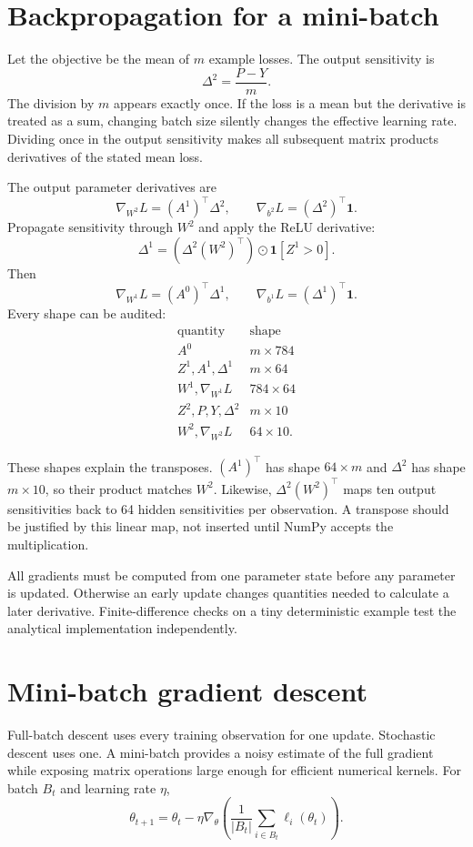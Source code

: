 \section{Backpropagation for a mini-batch}

Let the objective be the mean of $m$ example losses. The output sensitivity is
\[
  \Delta^2=\frac{P-Y}{m}.
\]
The division by $m$ appears exactly once. If the loss is a mean but the
derivative is treated as a sum, changing batch size silently changes the
effective learning rate. Dividing once in the output sensitivity makes all
subsequent matrix products derivatives of the stated mean loss.

The output parameter derivatives are
\[
  \nabla_{W^2}L=(A^1)^\top\Delta^2,
  \qquad
  \nabla_{b^2}L=(\Delta^2)^\top\mathbf1.
\]
Propagate sensitivity through $W^2$ and apply the ReLU derivative:
\[
  \Delta^1
  =\left(\Delta^2(W^2)^\top\right)
   \odot \mathbf1[Z^1>0].
\]
Then
\[
  \nabla_{W^1}L=(A^0)^\top\Delta^1,
  \qquad
  \nabla_{b^1}L=(\Delta^1)^\top\mathbf1.
\]
Every shape can be audited:
\[
\begin{array}{c|c}
\text{quantity}&\text{shape}\\ \hline
A^0&m\times784\\
Z^1,A^1,\Delta^1&m\times64\\
W^1,\nabla_{W^1}L&784\times64\\
Z^2,P,Y,\Delta^2&m\times10\\
W^2,\nabla_{W^2}L&64\times10.
\end{array}
\]

These shapes explain the transposes. $(A^1)^\top$ has shape $64\times m$ and
$\Delta^2$ has shape $m\times10$, so their product matches $W^2$. Likewise,
$\Delta^2(W^2)^\top$ maps ten output sensitivities back to 64 hidden
sensitivities per observation. A transpose should be justified by this linear
map, not inserted until NumPy accepts the multiplication.

All gradients must be computed from one parameter state before any parameter
is updated. Otherwise an early update changes quantities needed to calculate a
later derivative. Finite-difference checks on a tiny deterministic example
test the analytical implementation independently.

\section{Mini-batch gradient descent}

Full-batch descent uses every training observation for one update. Stochastic
descent uses one. A mini-batch provides a noisy estimate of the full gradient
while exposing matrix operations large enough for efficient numerical kernels.
For batch $B_t$ and learning rate $\eta$,
\[
  \theta_{t+1}
  =\theta_t-\eta\nabla_\theta
   \left(\frac1{|B_t|}\sum_{i\in B_t}\ell_i(\theta_t)\right).
\]

